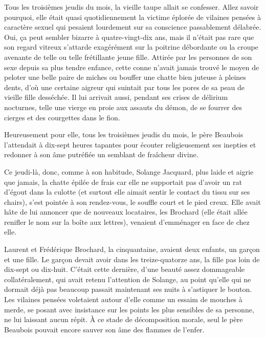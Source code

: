 Tous les troisièmes jeudis du mois, la vieille taupe allait se confesser. Allez savoir pourquoi, elle était quasi quotidiennement la victime éplorée de vilaines pensées à caractère sexuel qui pesaient lourdement sur sa conscience passablement délabrée. Oui, ça peut sembler bizarre à quatre-vingt-dix ans, mais il n’était pas rare que son regard vitreux s’attarde exagérément sur la poitrine débordante ou la croupe avenante de telle ou telle frétillante jeune fille. Attirée par les personnes de son sexe depuis sa plus tendre enfance, cette conne n’avait jamais trouvé le moyen de peloter une belle paire de miches ou bouffer une chatte bien juteuse à pleines dents, d’où une certaine aigreur qui suintait par tous les pores de sa peau de vieille fille desséchée. Il lui arrivait aussi, pendant ses crises de délirium nocturnes, telle une vierge en proie aux assauts du démon, de se fourrer des cierges et des courgettes dans le fion.

%

Heureusement pour elle, tous les troisièmes jeudis du mois, le père Beaubois l’attendait à dix-sept heures tapantes pour écouter religieusement ses inepties et redonner à son âme putréfiée un semblant de fraîcheur divine.

Ce jeudi-là, donc, comme à son habitude, Solange Jacquard, plus laide et aigrie que jamais, la chatte épilée de frais car elle ne supportait pas d’avoir un rat d’égout dans la culotte (et surtout elle aimait sentir le contact du tissu sur ses chairs), s’est pointée à son rendez-vous, le souffle court et le pied creux. Elle avait hâte de lui annoncer que de nouveaux locataires, les Brochard (elle était allée renifler le nom sur la boîte aux lettres), venaient d’emménager en face de chez elle.

Laurent et Frédérique Brochard, la cinquantaine, avaient deux enfants, un garçon et une fille. Le garçon devait avoir dans les treize-quatorze ans, la fille pas loin de dix-sept ou dix-huit. C’était cette dernière, d’une beauté assez dommageable collatéralement, qui avait retenu l’attention de Solange, au point qu’elle qui ne dormait déjà pas beaucoup passait maintenant ses nuits à s’astiquer le bouton. Les vilaines pensées voletaient autour d’elle comme un essaim de mouches à merde, se posant avec insistance sur les points les plus sensibles de sa personne, ne lui laissant aucun répit. À ce stade de décomposition morale, seul le père Beaubois pouvait encore sauver son âme des flammes de l’enfer.

